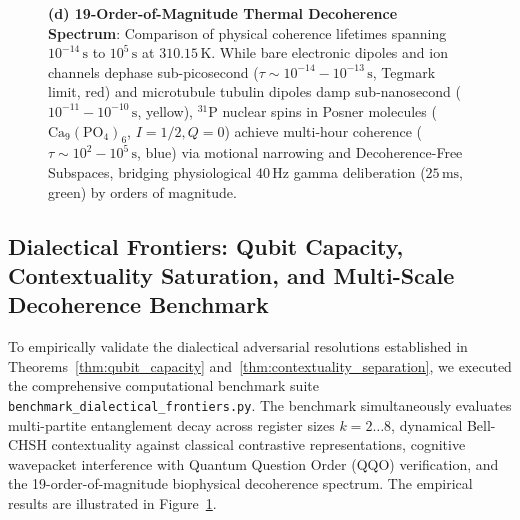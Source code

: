 \documentclass[10pt,twocolumn,3p]{article}
\begin{document}
\begin{figure}[t!]
{    \textbf{(d) 19-Order-of-Magnitude Thermal Decoherence Spectrum}: Comparison of physical coherence lifetimes spanning $10^{-14}\,\text{s}$ to $10^5\,\text{s}$ at $310.15\,\text{K}$. While bare electronic dipoles and ion channels dephase sub-picosecond ($\tau \sim 10^{-14} - 10^{-13}\,\text{s}$, Tegmark limit, red) and microtubule tubulin dipoles damp sub-nanosecond ($10^{-11} - 10^{-10}\,\text{s}$, yellow), $^{31}\text{P}$ nuclear spins in Posner molecules ($\text{Ca}_9(\text{PO}_4)_6$, $I=1/2, Q=0$) achieve multi-hour coherence ($\tau \sim 10^2 - 10^5\,\text{s}$, blue) via motional narrowing and Decoherence-Free Subspaces, bridging physiological $40\,\text{Hz}$ gamma deliberation ($25\,\text{ms}$, green) by orders of magnitude.}
    \label{fig:dialectical_synthesis}
\end{figure}

\subsection{Dialectical Frontiers: Qubit Capacity, Contextuality Saturation, and Multi-Scale Decoherence Benchmark}
\label{subsec:bench_dialectical_frontiers}

To empirically validate the dialectical adversarial resolutions established in Theorems~\ref{thm:qubit_capacity} and~\ref{thm:contextuality_separation}, we executed the comprehensive computational benchmark suite \texttt{benchmark\_dialectical\_frontiers.py}. The benchmark simultaneously evaluates multi-partite entanglement decay across register sizes $k = 2 \dots 8$, dynamical Bell-CHSH contextuality against classical contrastive representations, cognitive wavepacket interference with Quantum Question Order (QQO) verification, and the 19-order-of-magnitude biophysical decoherence spectrum. The empirical results are illustrated in Figure~\ref{fig:dialectical_synthesis}.
\end{document}
